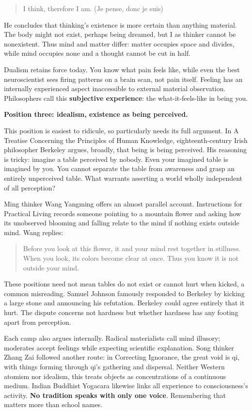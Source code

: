\begin{quote}
I think, therefore I am. (Je pense, donc je suis)
\end{quote}
He concludes that thinking's existence is more certain than anything material. The body might not exist, perhaps being dreamed, but I as thinker cannot be nonexistent. Thus mind and matter differ: matter occupies space and divides, while mind occupies none and a thought cannot be cut in half.

Dualism retains force today. You know what pain feels like, while even the best neuroscientist sees firing patterns on a brain scan, not pain itself. Feeling has an internally experienced aspect inaccessible to external material observation. Philosophers call this \textbf{subjective experience}: the what-it-feels-like in being you.

\textbf{Position three: idealism, existence as being perceived.}

This position is easiest to ridicule, so particularly needs its full argument. In A Treatise Concerning the Principles of Human Knowledge, eighteenth-century Irish philosopher Berkeley argues, broadly, that being is being perceived. His reasoning is tricky: imagine a table perceived by nobody. Even your imagined table is imagined by you. You cannot separate the table from awareness and grasp an entirely unperceived table. What warrants asserting a world wholly independent of all perception?

Ming thinker Wang Yangming offers an almost parallel account. Instructions for Practical Living records someone pointing to a mountain flower and asking how its unobserved blooming and falling relate to the mind if nothing exists outside mind. Wang replies:

\begin{quote}
Before you look at this flower, it and your mind rest together in stillness. When you look, its colors become clear at once. Thus you know it is not outside your mind.
\end{quote}
These positions need not mean tables do not exist or cannot hurt when kicked, a common misreading. Samuel Johnson famously responded to Berkeley by kicking a large stone and announcing his refutation. Berkeley could agree entirely that it hurt. The dispute concerns not hardness but whether hardness has any footing apart from perception.

Each camp also argues internally. Radical materialists call mind illusory; moderates accept feelings while expecting scientific explanation. Song thinker Zhang Zai followed another route: in Correcting Ignorance, the great void is qi, with things forming through qi's gathering and dispersal. Neither Western atomism nor idealism, this treats objects as concentrations of a continuous medium. Indian Buddhist Yogacara likewise links all experience to consciousness's activity. \textbf{No tradition speaks with only one voice}. Remembering that matters more than school names.


